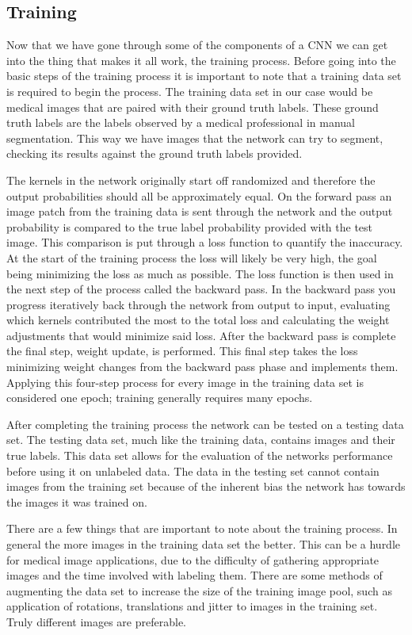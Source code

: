 \documentclass{sig-alternate}
\begin{document}
\subsection{Training}
\label{sec:training}

Now that we have gone through some of the components of a CNN we can get into the thing that makes it all work, the training process. Before going into the basic steps of the training process it is important to note that a training data set is required to begin the process. The training data set in our case would be medical images that are paired with their ground truth labels. These ground truth labels are the labels observed by a medical professional in manual segmentation. This way we have images that the network can try to segment, checking its results against the ground truth labels provided.

The kernels in the network originally start off randomized and therefore the output probabilities should all be approximately equal. On the forward pass an image patch from the training data is sent through the network and the output probability is compared to the true label probability provided with the test image. This comparison is put through a loss function to quantify the inaccuracy. At the start of the training process the loss will likely be very high, the goal being minimizing the loss as much as possible. The loss function is then used in the next step of the process called the backward pass. In the backward pass you progress iteratively back through the network from output to input, evaluating which kernels contributed the most to the total loss and calculating the weight adjustments that would minimize said loss. After the backward pass is complete the final step, weight update, is performed. This final step takes the loss minimizing weight changes from the backward pass phase and implements them. Applying this four-step process for every image in the training data set is considered one epoch; training generally requires many epochs.

After completing the training process the network can be tested on a testing data set. The testing data set, much like the training data, contains images and their true labels. This data set allows for the evaluation of the networks performance before using it on unlabeled data. The data in the testing set cannot contain images from the training set because of the inherent bias the network has towards the images it was trained on.

There are a few things that are important to note about the training process. In general the more images in the training data set the better. This can be a hurdle for medical image applications, due to the difficulty of gathering appropriate images and the time involved with labeling them. There are some methods of augmenting the data set to increase the size of the training image pool, such as application of rotations, translations and jitter to images in the training set. Truly different images are preferable.
\end{document}

